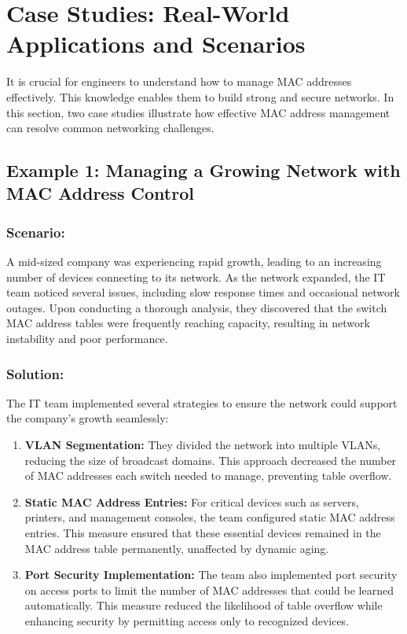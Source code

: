 \documentclass[11pt,a4paper]{article}
\begin{document}
\section*{Case Studies: Real-World Applications and Scenarios}

It is crucial for engineers to understand how to manage MAC addresses effectively. This knowledge enables them to build strong and secure networks. In this section, two case studies illustrate how effective MAC address management can resolve common networking challenges.

\subsection*{Example 1: Managing a Growing Network with MAC Address Control}

\subsubsection*{Scenario:}
A mid-sized company was experiencing rapid growth, leading to an increasing number of devices connecting to its network. As the network expanded, the IT team noticed several issues, including slow response times and occasional network outages. Upon conducting a thorough analysis, they discovered that the switch MAC address tables were frequently reaching capacity, resulting in network instability and poor performance.


\subsubsection*{Solution:}
The IT team implemented several strategies to ensure the network could support the company’s growth seamlessly:

\begin{enumerate}
    \item \textbf{VLAN Segmentation:} They divided the network into multiple VLANs, reducing the size of broadcast domains. This approach decreased the number of MAC addresses each switch needed to manage, preventing table overflow.
    \item \textbf{Static MAC Address Entries:} For critical devices such as servers, printers, and management consoles, the team configured static MAC address entries. This measure ensured that these essential devices remained in the MAC address table permanently, unaffected by dynamic aging.
    \item \textbf{Port Security Implementation:} The team also implemented port security on access ports to limit the number of MAC addresses that could be learned automatically. This measure reduced the likelihood of table overflow while enhancing security by permitting access only to recognized devices.
\end{enumerate}
\end{document}

